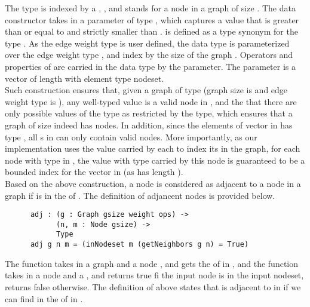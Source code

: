 The  type is indexed by a , , and stands for a node in a graph of size . The data constructor  takes in a parameter of type , which captures a  value that is greater than or equal to  and strictly smaller than .  is defined as a type synonym for the type . As the edge weight type is user defined, the  data type is parameterized over the edge weight type , and index by the size of the graph . Operators and properties of  are carried in the  data type by the  parameter. The  parameter is a vector of length  with element type {nodeset}. 
\\

Such construction ensures that, given a graph  of type  (graph size is  and edge weight type is ), any well-typed  value is a valid node in , and the that there are only  possible values of the type  as restricted by the  type, which ensures that a graph of size  indeed has  nodes. In addition, since the elements of vector  in  has type , all s in  can only contain valid nodes. More importantly, as our implementation uses the value carried by each  to index its  in the graph, for each node with type  in , the value with type  carried by this node is guaranteed to be a bounded index for the vector  in  (as  has length ). 
\\

Based on the above construction, a node  is considered as adjacent to a node  in a graph  if  is in the  of . The definition of adjancent nodes is provided below. 
\begin{lstlisting}
      adj : (g : Graph gsize weight ops) ->
            (n, m : Node gsize) -> 
            Type
      adj g n m = (inNodeset m (getNeighbors g n) = True)
\end{lstlisting}

The  function takes in a graph  and a node , and gets the  of  in , and the  function takes in a node and a , and returns true fi the input node is in the input nodeset, returns false otherwise. The definition of  above states that  is adjacent to  in  if we can find  in the  of  in . 
\\


